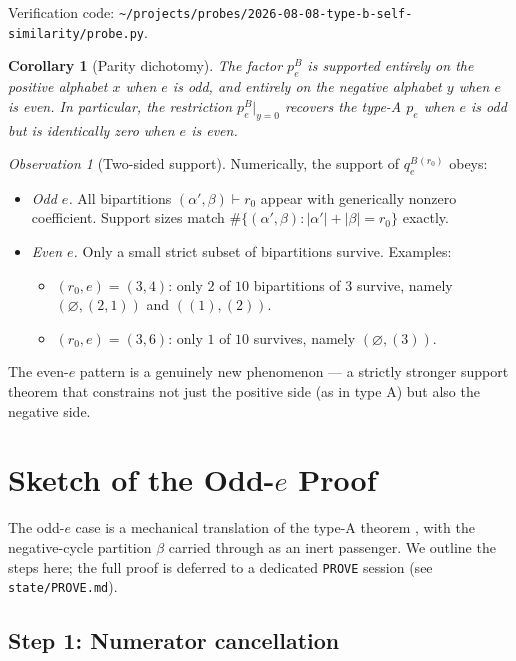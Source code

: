 \documentclass[11pt]{article}
\newtheorem{corollary}[theorem]{Corollary}
\theoremstyle{remark}
\newtheorem{observation}[theorem]{Observation}
\newcommand{\qeB}{q_e^B}
\newcommand{\peB}{p_e^B}
\newcommand{\emptyy}{\varnothing}
\begin{document}
Verification code: \verb|~/projects/probes/2026-08-08-type-b-self-similarity/probe.py|.

\begin{corollary}[Parity dichotomy]\label{cor:parity}
The factor $\peB$ is supported entirely on the positive alphabet $x$ when $e$ is odd, and entirely on the negative alphabet $y$ when $e$ is even. In particular, the restriction $\peB\big|_{y = 0}$ recovers the type-A $p_e$ when $e$ is odd but is identically zero when $e$ is even.
\end{corollary}

\begin{observation}[Two-sided support]\label{obs:supp}
Numerically, the support of $\qeB^{(r_0)}$ obeys:
\begin{itemize}
  \item \emph{Odd $e$.} All bipartitions $(\alpha', \beta) \vdash r_0$ appear with generically nonzero coefficient. Support sizes match $\#\{(\alpha', \beta) : |\alpha'| + |\beta| = r_0\}$ exactly.
  \item \emph{Even $e$.} Only a small strict subset of bipartitions survive. Examples:
  \begin{itemize}
    \item $(r_0, e) = (3, 4)$: only $2$ of $10$ bipartitions of $3$ survive, namely $(\emptyy, (2,1))$ and $((1), (2))$.
    \item $(r_0, e) = (3, 6)$: only $1$ of $10$ survives, namely $(\emptyy, (3))$.
  \end{itemize}
\end{itemize}
The even-$e$ pattern is a genuinely new phenomenon --- a strictly stronger support theorem that constrains not just the positive side (as in type A) but also the negative side.
\end{observation}

\section{Sketch of the Odd-$e$ Proof}

The odd-$e$ case is a mechanical translation of the type-A theorem \cite{Cli26-selfsim}, with the negative-cycle partition $\beta$ carried through as an inert passenger. We outline the steps here; the full proof is deferred to a dedicated \texttt{PROVE} session (see \texttt{state/PROVE.md}).

\subsection*{Step 1: Numerator cancellation}
\end{document}
